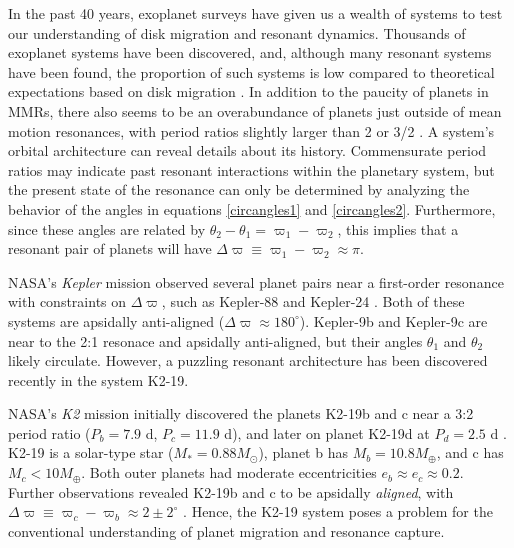 \documentclass[usenatbib]{mnras}
\begin{document}
In the past 40 years, exoplanet surveys have given us a wealth of
systems to test our understanding of disk migration and resonant
dynamics.  Thousands of exoplanet systems have been discovered, and,
although many resonant systems have been found, the proportion of such
systems is low compared to theoretical expectations based on disk
migration \cite{fabrycky_architecture_2014}.  In addition to the paucity
of planets in MMRs, there also seems to be an overabundance of planets
just outside of mean motion resonances, with period ratios slightly
larger than 2 or 3/2
\cite{fabrycky_architecture_2014,choksi_sub-neptune_2020}.  A system's
orbital architecture can reveal details about its history.
Commensurate period ratios may indicate past resonant interactions
within the planetary system, but the present state of the resonance
can only be determined by analyzing the behavior of the angles in
equations \eqref{circangles1} and \eqref{circangles2}.  Furthermore, since
these angles are related by \(\theta_2-\theta_1=\varpi_1-\varpi_2\),
this implies that a resonant pair of planets will have
\(\Delta\varpi\equiv \varpi_1-\varpi_2\approx \pi\).

NASA's \emph{Kepler} mission observed several planet pairs near a
first-order resonance with constraints on \(\Delta\varpi\), such as
Kepler-88 \cite{weiss_discovery_2020} and Kepler-24
\cite{antoniadou_exploiting_2020}. Both of these systems are apsidally
anti-aligned (\(\Delta\varpi\approx180^\circ\)).  Kepler-9b and
Kepler-9c are near to the 2:1 resonace and apsidally anti-aligned, but
their angles \(\theta_1\) and \(\theta_2\) likely circulate.  However, a
puzzling resonant architecture has been discovered recently in the
system K2-19.

NASA's \emph{K2} mission initially discovered the planets K2-19b and c
near a 3:2 period ratio (\(P_b=7.9\) d, \(P_c=11.9\) d), and later on
planet K2-19d at \(P_d=2.5\) d
\cite{howell14_k2_mission,armstrong15_one_closes_exopl_pairs_to,sinukoff16_eleven_multip_system_fromk_masses}.
K2-19 is a solar-type star (\(M_*=0.88M_\odot\)), planet b has
\(M_{b}=10.8 M_{\oplus}\), and c has \(M_{c}<10M_{\oplus}\).  Both outer
planets had moderate eccentricities \(e_b\approx e_c\approx 0.2\).
Further observations revealed K2-19b and c to be apsidally
\emph{aligned}, with \(\Delta\varpi\equiv \varpi_c-\varpi_b \approx
2\pm 2^\circ\) \cite{petigura_k2-19b_2020}.  Hence, the K2-19 system
poses a problem for the conventional understanding of planet migration
and resonance capture.
\end{document}
